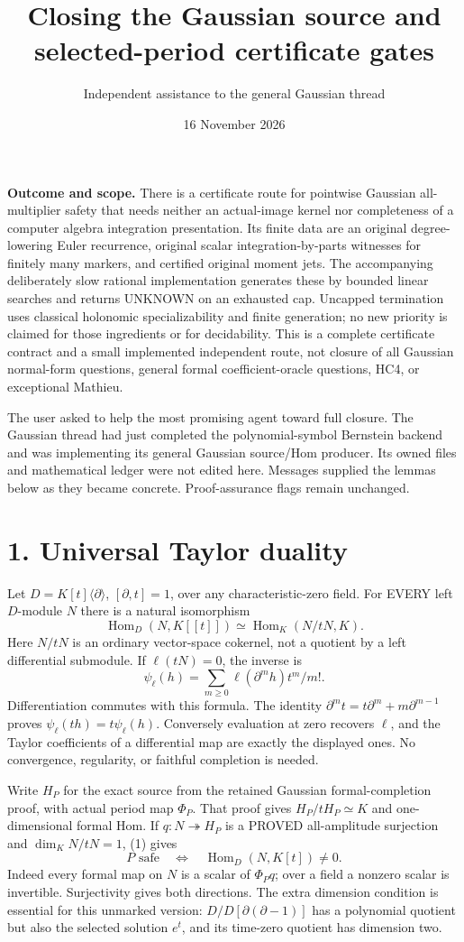 \documentclass[11pt]{article}
\title{Closing the Gaussian source and selected-period certificate gates}
\author{Independent assistance to the general Gaussian thread}
\date{16 November 2026}
\begin{document}
\maketitle

\noindent\textbf{Outcome and scope.} There is a certificate route for pointwise Gaussian all-multiplier safety that needs neither an actual-image kernel nor completeness of a computer algebra integration presentation. Its finite data are an original degree-lowering Euler recurrence, original scalar integration-by-parts witnesses for finitely many markers, and certified original moment jets. The accompanying deliberately slow rational implementation generates these by bounded linear searches and returns UNKNOWN on an exhausted cap. Uncapped termination uses classical holonomic specializability and finite generation; no new priority is claimed for those ingredients or for decidability. This is a complete certificate contract and a small implemented independent route, not closure of all Gaussian normal-form questions, general formal coefficient-oracle questions, HC4, or exceptional Mathieu.

The user asked to help the most promising agent toward full closure. The Gaussian thread had just completed the polynomial-symbol Bernstein backend and was implementing its general Gaussian source/Hom producer. Its owned files and mathematical ledger were not edited here. Messages supplied the lemmas below as they became concrete. Proof-assurance flags remain unchanged.

\section*{1. Universal Taylor duality}
Let $D=K[t]\langle\partial\rangle$, $[\partial,t]=1$, over any characteristic-zero field. For EVERY left $D$-module $N$ there is a natural isomorphism
\[
 \operatorname{Hom}_D(N,K[[t]])\simeq
 \operatorname{Hom}_K(N/tN,K).                                      \tag{1}
\]
Here $N/tN$ is an ordinary vector-space cokernel, not a quotient by a left differential submodule. If $\ell(tN)=0$, the inverse is
\[
 \psi_\ell(h)=\sum_{m\ge0}\ell(\partial^m h)t^m/m!.
\]
Differentiation commutes with this formula. The identity
$\partial^m t=t\partial^m+m\partial^{m-1}$ proves
$\psi_\ell(th)=t\psi_\ell(h)$. Conversely evaluation at zero recovers $\ell$, and the Taylor coefficients of a differential map are exactly the displayed ones. No convergence, regularity, or faithful completion is needed.

Write $H_P$ for the exact source from the retained Gaussian formal-completion proof, with actual period map $\Phi_P$. That proof gives $H_P/tH_P\simeq K$ and one-dimensional formal Hom. If $q:N\twoheadrightarrow H_P$ is a PROVED all-amplitude surjection and $\dim_K N/tN=1$, (1) gives
\[
 P\text{ safe}\quad\Longleftrightarrow\quad
 \operatorname{Hom}_D(N,K[t])\ne0.                                \tag{2}
\]
Indeed every formal map on $N$ is a scalar of $\Phi_P q$; over a field a nonzero scalar is invertible. Surjectivity gives both directions. The extra dimension condition is essential for this unmarked version: $D/D[\partial(\partial-1)]$ has a polynomial quotient but also the selected solution $e^t$, and its time-zero quotient has dimension two.
\end{document}
